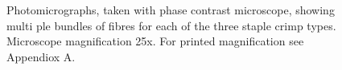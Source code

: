 %
\begin{figure}
\begin{turn}{90}
\begin{minipage}[c][\textwidth][c]{\textheight}
 \hfill
 \hfill
\caption{Photomicrographs, taken with phase contrast microscope, showing multi
ple bundles of fibres for each of the three staple crimp types. Microscope magnification 25x. For printed magnification see Appendiox A.}
\label{fig:fibre3types}
\end{minipage}
\end{turn}
\end{figure}
%
